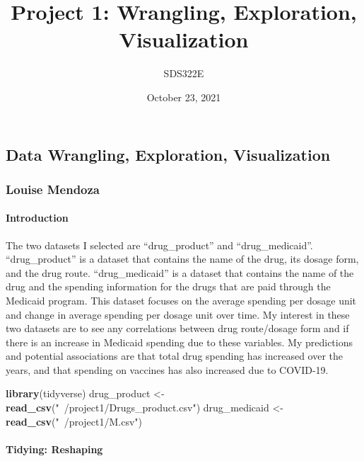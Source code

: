 \documentclass[
]{article}
\title{Project 1: Wrangling, Exploration, Visualization}
\author{SDS322E}
\date{October 23, 2021}
\newenvironment{Shaded}{\begin{snugshade}}{\end{snugshade}}
\newcommand{\KeywordTok}[1]{\textcolor[rgb]{0.13,0.29,0.53}{\textbf{#1}}}
\newcommand{\NormalTok}[1]{#1}
\newcommand{\StringTok}[1]{\textcolor[rgb]{0.31,0.60,0.02}{#1}}
\begin{document}
\maketitle

\hypertarget{data-wrangling-exploration-visualization}{%
\subsection{Data Wrangling, Exploration,
Visualization}\label{data-wrangling-exploration-visualization}}

\hypertarget{louise-mendoza}{%
\subsubsection{Louise Mendoza}\label{louise-mendoza}}

\hypertarget{introduction}{%
\paragraph{Introduction}\label{introduction}}

The two datasets I selected are ``drug\_product'' and
``drug\_medicaid''. ``drug\_product'' is a dataset that contains the
name of the drug, its dosage form, and the drug route.
``drug\_medicaid'' is a dataset that contains the name of the drug and
the spending information for the drugs that are paid through the
Medicaid program. This dataset focuses on the average spending per
dosage unit and change in average spending per dosage unit over time. My
interest in these two datasets are to see any correlations between drug
route/dosage form and if there is an increase in Medicaid spending due
to these variables. My predictions and potential associations are that
total drug spending has increased over the years, and that spending on
vaccines has also increased due to COVID-19.

\begin{Shaded}
\begin{Highlighting}[]
\KeywordTok{library}\NormalTok{(tidyverse)}
\NormalTok{drug_product <-}\StringTok{ }\KeywordTok{read_csv}\NormalTok{(}\StringTok{"~/project1/Drugs_product.csv"}\NormalTok{)}
\NormalTok{drug_medicaid <-}\StringTok{ }\KeywordTok{read_csv}\NormalTok{(}\StringTok{"~/project1/M.csv"}\NormalTok{)}
\end{Highlighting}
\end{Shaded}

\hypertarget{tidying-reshaping}{%
\paragraph{Tidying: Reshaping}\label{tidying-reshaping}}
\end{document}

